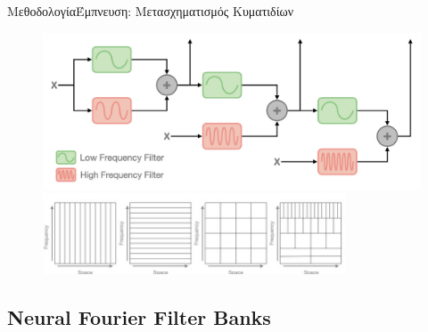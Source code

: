 \documentclass[10pt]{beamer}
\begin{document}
\begin{frame}{Μεθοδολογία}{Έμπνευση: Μετασχηματισμός Κυματιδίων} 
\begin{figure}
    \centering
    \includegraphics[width=\textwidth]{images/LowFreqHighFreqNFFBSignalDecomposition.jpg}
    \includegraphics[width=0.8\textwidth]{images/spatial-frequency_decomposition.jpg}
\end{figure}
\end{frame}
\subsection{Neural Fourier Filter Banks}
\end{document}
